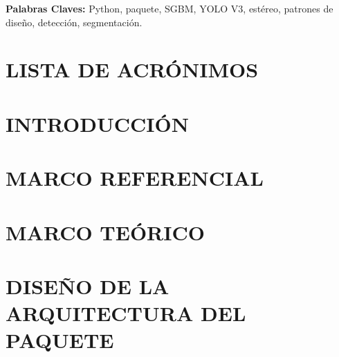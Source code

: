 \documentclass[letterpaper,titlepage,12pt,oneside,spanish,final]{report_eie}
\numberwithin{equation}{chapter}%
\numberwithin{figure}{chapter}%
\numberwithin{table}{chapter}%
\numberwithin{definition}{chapter}%
\numberwithin{lemma}{chapter}%
\numberwithin{theorem}{chapter}%
\numberwithin{corollary}{chapter}%
\numberwithin{condition}{chapter}%
\numberwithin{criterion}{chapter}%
\numberwithin{problem}{chapter}%
\numberwithin{property}{chapter}%
\numberwithin{proposition}{chapter}%
\numberwithin{solution}{chapter}%
\numberwithin{conjecture}{chapter}%
\begin{document}
\begin{spacing}{1}
\textbf{Palabras Claves:} Python, paquete, SGBM, YOLO V3, estéreo, patrones de diseño, detección, segmentación. \\[1ex]
\end{spacing}

%
\thispagestyle{empty}%
\newpage
\addtocounter{page}{3}%
\setlength{\parskip}{2pt}%
\tableofcontents%
\listoffigures%
\listoftables%

\newpage

\chapter*{LISTA DE ACRÓNIMOS}%
%
%

\justifying
\chapter*{INTRODUCCIÓN}\label{CAP:intro}
\setlength{\parskip}{14pt}%
%

%
%

\chapter{MARCO REFERENCIAL}\label{CAP:marcoref}
%

\chapter{MARCO TEÓRICO}\label{CAP:teor}
%

\chapter{DISEÑO DE LA ARQUITECTURA DEL PAQUETE}\label{CAP:entorno}
%
\end{document}
